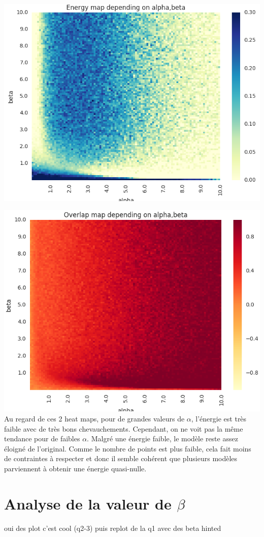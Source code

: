 \documentclass[twocolumn]{article}
\begin{document}
		
		\includegraphics[width=\columnwidth]{../tobekept/ex2_2323132067031870085-r.png}
		
		\includegraphics[width=\columnwidth]{../tobekept/ex3_2323132067031870085-r.png}
		Au regard de ces 2 heat maps, pour de grandes valeurs de $\alpha$, l'énergie est très faible avec de très bons chevauchements. Cependant, on ne voit pas la même tendance pour de faibles $\alpha$. Malgré une énergie faible, le modèle reste assez éloigné de l'original. Comme le nombre de points est plus faible, cela fait moins de contraintes à respecter et donc il semble cohérent que plusieurs modèles parviennent à obtenir une énergie quasi-nulle. 
	\section{Analyse de la valeur de $\beta$}
		oui des plot c'est cool (q2-3)
		puis replot de la q1 avec des beta hinted
\end{document}
